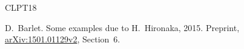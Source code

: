 \documentclass[11pt]{amsart}
\theoremstyle{definition}
\theoremstyle{remark}
\numberwithin{equation}{section}
\begin{document}
\newcommand{\etalchar}[1]{$^{#1}$}
\begin{thebibliography}{CLPT18}


D.~Barlet.
\newblock Some examples due to {H.~Hironaka}, 2015.
\newblock Preprint, \href{https://arxiv.org/abs/1501.01129}{arXiv:1501.01129v2}, Section~6.







\end{thebibliography}
\end{document}
